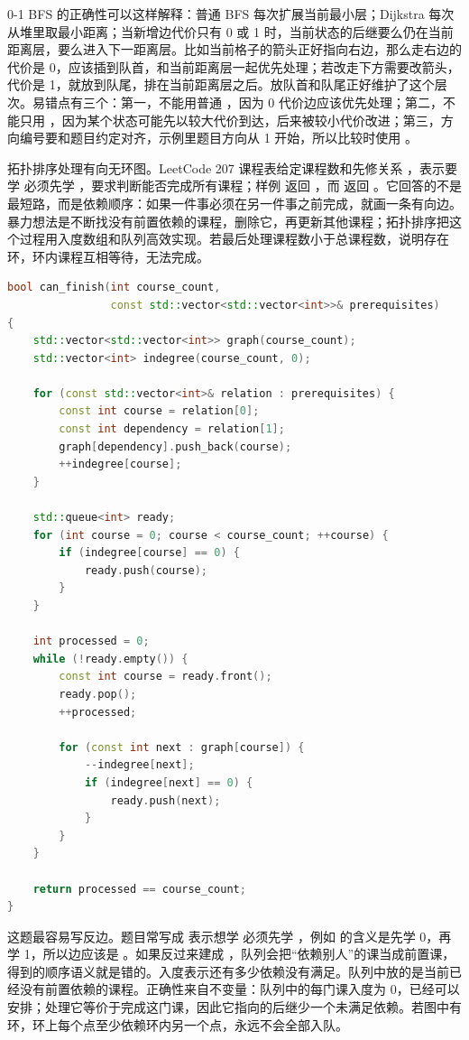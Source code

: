 0-1 BFS 的正确性可以这样解释：普通 BFS 每次扩展当前最小层；Dijkstra 每次从堆里取最小距离；当新增边代价只有 0 或 1 时，当前状态的后继要么仍在当前距离层，要么进入下一距离层。比如当前格子的箭头正好指向右边，那么走右边的代价是 0，应该插到队首，和当前距离层一起优先处理；若改走下方需要改箭头，代价是 1，就放到队尾，排在当前距离层之后。放队首和队尾正好维护了这个层次。易错点有三个：第一，不能用普通 ，因为 0 代价边应该优先处理；第二，不能只用 ，因为某个状态可能先以较大代价到达，后来被较小代价改进；第三，方向编号要和题目约定对齐，示例里题目方向从 1 开始，所以比较时使用 。

拓扑排序处理有向无环图。LeetCode 207 课程表给定课程数和先修关系 \code{[a,b]}，表示要学  必须先学 ，要求判断能否完成所有课程；样例  返回 ，而 \code{[[1,0],[0,1]]} 返回 。它回答的不是最短路，而是依赖顺序：如果一件事必须在另一件事之前完成，就画一条有向边。暴力想法是不断找没有前置依赖的课程，删除它，再更新其他课程；拓扑排序把这个过程用入度数组和队列高效实现。若最后处理课程数小于总课程数，说明存在环，环内课程互相等待，无法完成。

\begin{lstlisting}[language=C++,caption={LeetCode 207 课程表：Kahn 拓扑排序判断是否有环}]
bool can_finish(int course_count,
                const std::vector<std::vector<int>>& prerequisites)
{
    std::vector<std::vector<int>> graph(course_count);
    std::vector<int> indegree(course_count, 0);

    for (const std::vector<int>& relation : prerequisites) {
        const int course = relation[0];
        const int dependency = relation[1];
        graph[dependency].push_back(course);
        ++indegree[course];
    }

    std::queue<int> ready;
    for (int course = 0; course < course_count; ++course) {
        if (indegree[course] == 0) {
            ready.push(course);
        }
    }

    int processed = 0;
    while (!ready.empty()) {
        const int course = ready.front();
        ready.pop();
        ++processed;

        for (const int next : graph[course]) {
            --indegree[next];
            if (indegree[next] == 0) {
                ready.push(next);
            }
        }
    }

    return processed == course_count;
}
\end{lstlisting}

这题最容易写反边。题目常写成 \code{[a, b]} 表示想学  必须先学 ，例如 \code{[1,0]} 的含义是先学 0，再学 1，所以边应该是 。如果反过来建成 ，队列会把“依赖别人”的课当成前置课，得到的顺序语义就是错的。入度表示还有多少依赖没有满足。队列中放的是当前已经没有前置依赖的课程。正确性来自不变量：队列中的每门课入度为 0，已经可以安排；处理它等价于完成这门课，因此它指向的后继少一个未满足依赖。若图中有环，环上每个点至少依赖环内另一个点，永远不会全部入队。

